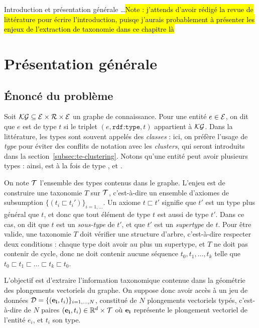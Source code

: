 \label{chap:te}

Introduction et présentation générale \ldots \hl{Note : j'attends d'avoir rédigé la revue de littérature pour écrire l'introduction, puisqe j'aurais probablement à présenter les enjeux de l'extraction de taxonomie dans ce chapitre là}


\section{Présentation générale}
\subsection{Énoncé du problème}
\label{sec:te-problem}
Soit $\KG \subseteq \Ent \times \Rel \times \Ent$ un graphe de connaissance. Pour une entité $e \in \Ent$, on dit que $e$ est de type $t$ si le triplet $(e, \texttt{rdf:type}, t)$ appartient à $\KG$. Dans la littérature, les types sont souvent appelés des \textit{classes} : ici, on préfère l'usage de \textit{type} pour éviter des conflits de notation avec les \textit{clusters}, qui seront introduits dans la section~\ref{subsec:te-clustering}. Notons qu'une entité peut avoir plusieurs types : ainsi,  est à la fois de type ,  et .

On note $\cal{T}$ l'ensemble des types contenus dans le graphe. L'enjeu est de construire une taxonomie $T$ sur $\cal{T}$, c'est-à-dire un ensemble d'axiomes de subsumption $\{(t_i \sqsubset t_i')\}_{i=1, \ldots}$. Un axiome $t \sqsubset t'$ signifie que $t'$ est un type plus général que $t$, et donc que tout élément de type $t$ est aussi de type $t'$. Dans ce cas, on dit que $t$ est un \textit{sous-type} de $t'$, et que $t'$ est un \textit{supertype} de $t$.
Pour être valide, une taxonomie $T$ doit vérifier une structure d'arbre, c'est-à-dire respecter deux conditions : chaque type doit avoir au plus un supertype, et $T$ ne doit pas contenir de cycle, donc ne doit contenir aucune séquence $t_0, t_1, \ldots, t_k$ telle que $t_0 \sqsubset t_1 \sqsubset \ldots \sqsubset t_k \sqsubset t_0$.


L'objectif est d'extraire l'information taxonomique contenue dans la géométrie des plongements vectoriels du graphe. On suppose donc avoir accès à un jeu de données $\cal{D} = \{ (\mathbf{e_i}, t_i) \}_{i=1, \ldots, N}$, constitué de $N$ plongements vectoriels typés, c'est-à-dire de $N$ paires $(\bf{e_i}, t_i) \in \R^d \times \cal{T}$ où $\bf{e_i}$ représente le plongement vectoriel de l'entité $e_i$, et $t_i$ son type. 


